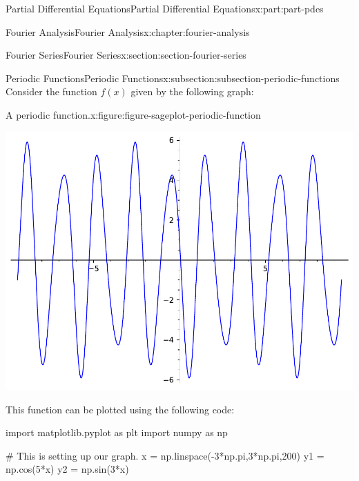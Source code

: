 \documentclass[twoside,10pt,]{book}
\numberwithin{equation}{part}
\begin{document}
\begin{partptx}{Partial Differential Equations}{}{Partial Differential Equations}{}{}{x:part:part-pdes}
\begin{chapterptx}{Fourier Analysis}{}{Fourier Analysis}{}{}{x:chapter:fourier-analysis}
\begin{sectionptx}{Fourier Series}{}{Fourier Series}{}{}{x:section:section-fourier-series}
%
%
\typeout{************************************************}
\typeout{************************************************}
%
\begin{subsectionptx}{Periodic Functions}{}{Periodic Functions}{}{}{x:subsection:subsection-periodic-functions}
Consider the function \(f(x)\) given by the following graph:%
\begin{figureptx}{A periodic function.}{x:figure:figure-sageplot-periodic-function}{}%
\begin{image}{0}{1}{0}%
\includegraphics[width=\linewidth]{generated/sageplot/image-sageplot-periodic-function.pdf}%
\end{image}%
\tcblower
\end{figureptx}%
This function can be plotted using the following code:%
\begin{sageinput}
import matplotlib.pyplot as plt
import numpy as np

# This is setting up our graph.
x = np.linspace(-3*np.pi,3*np.pi,200)
y1 = np.cos(5*x)
y2 = np.sin(3*x)


\end{sageinput}
\end{subsectionptx}
\end{sectionptx}
\end{chapterptx}
\end{partptx}
\end{document}
